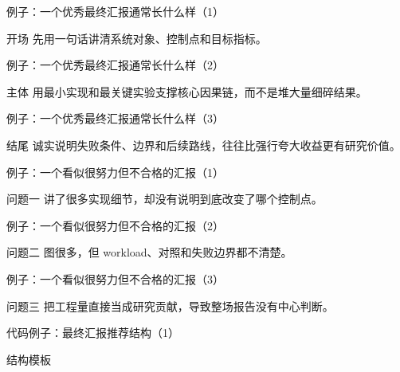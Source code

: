 \begin{frame}{例子：一个优秀最终汇报通常长什么样（1）}
\begin{block}{开场}
    先用一句话讲清系统对象、控制点和目标指标。
  \end{block}
\end{frame}

\begin{frame}{例子：一个优秀最终汇报通常长什么样（2）}
\begin{block}{主体}
    用最小实现和最关键实验支撑核心因果链，而不是堆大量细碎结果。
  \end{block}
\end{frame}

\begin{frame}{例子：一个优秀最终汇报通常长什么样（3）}
\begin{block}{结尾}
    诚实说明失败条件、边界和后续路线，往往比强行夸大收益更有研究价值。
  \end{block}
\end{frame}

\begin{frame}{例子：一个看似很努力但不合格的汇报（1）}
\begin{block}{问题一}
    讲了很多实现细节，却没有说明到底改变了哪个控制点。
  \end{block}
\end{frame}

\begin{frame}{例子：一个看似很努力但不合格的汇报（2）}
\begin{block}{问题二}
    图很多，但 workload、对照和失败边界都不清楚。
  \end{block}
\end{frame}

\begin{frame}{例子：一个看似很努力但不合格的汇报（3）}
\begin{block}{问题三}
    把工程量直接当成研究贡献，导致整场报告没有中心判断。
  \end{block}
\end{frame}

\begin{frame}{代码例子：最终汇报推荐结构（1）}
\begin{block}{结构模板}
    {\ttfamily\small
    \par
    \par
    \par
    \par
    }
  \end{block}
\end{frame}

